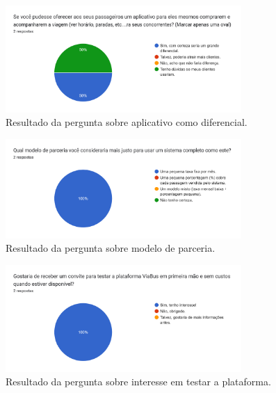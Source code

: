 \begin{apendicesenv}
  \begin{figure}[htbp]
    \centering
    \includegraphics[width=0.8\textwidth]{imagens/imagem9.png}
    \caption{Resultado da pergunta sobre aplicativo como diferencial.}
    \label{fig:resultado9}
  \end{figure}

  \begin{figure}[htbp]
    \centering
    \includegraphics[width=0.8\textwidth]{imagens/imagem10.png}
    \caption{Resultado da pergunta sobre modelo de parceria.}
    \label{fig:resultado10}
  \end{figure}

  \begin{figure}[htbp]
    \centering
    \includegraphics[width=0.8\textwidth]{imagens/imagem11.png}
    \caption{Resultado da pergunta sobre interesse em testar a plataforma.}
    \label{fig:resultado11}
  \end{figure}

\end{apendicesenv}